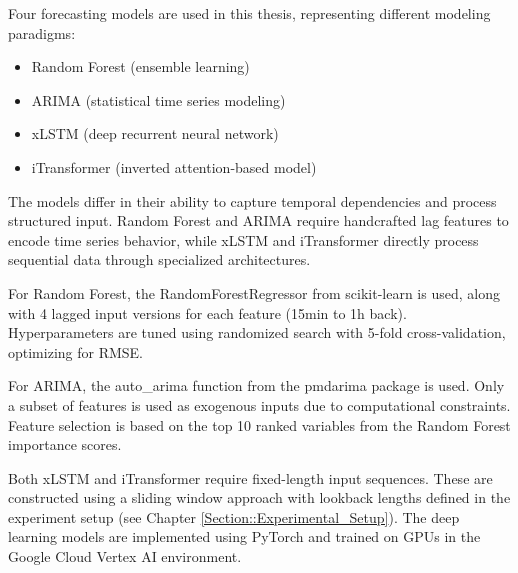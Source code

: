 \documentclass[class=scrbook, crop=false]{standalone}
\begin{document}
Four forecasting models are used in this thesis, representing different modeling paradigms:
\begin{itemize}
\item Random Forest (ensemble learning)
\item ARIMA (statistical time series modeling)
\item xLSTM (deep recurrent neural network)
\item iTransformer (inverted attention-based model)
\end{itemize}

The models differ in their ability to capture temporal dependencies and process structured input. Random Forest and ARIMA require handcrafted lag features to encode time series behavior, while xLSTM and iTransformer directly process sequential data through specialized architectures.

For Random Forest, the RandomForestRegressor from scikit-learn is used, along with 4 lagged input versions for each feature (15min to 1h back). Hyperparameters are tuned using randomized search with 5-fold cross-validation, optimizing for RMSE.

For ARIMA, the auto\_arima function from the pmdarima package is used. Only a subset of features is used as exogenous inputs due to computational constraints. Feature selection is based on the top 10 ranked variables from the Random Forest importance scores.

Both xLSTM and iTransformer require fixed-length input sequences. These are constructed using a sliding window approach with lookback lengths defined in the experiment setup (see Chapter \ref{Section::Experimental_Setup}). The deep learning models are implemented using PyTorch and trained on GPUs in the Google Cloud Vertex AI environment.


%

\end{document}
